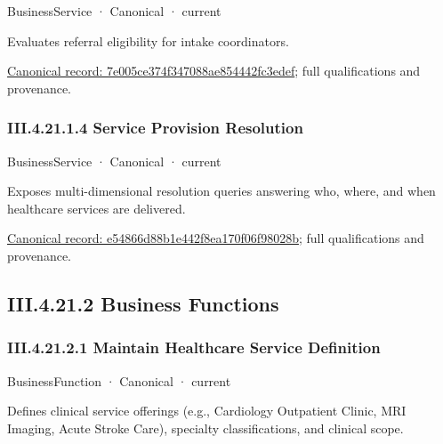 \label{element:7e005ce374f347088ae854442fc3edef}
{\small BusinessService · Canonical · current}\par

Evaluates referral eligibility for intake coordinators.


{\footnotesize \href{../../../../continuum/business/business-service/7e005ce374f347088ae854442fc3edef.md}{Canonical record: 7e005ce374f347088ae854442fc3edef}; full qualifications and provenance.}\par
\subsubsection*{III.4.21.1.4 Service Provision Resolution}
\label{navigation:III.4.21.1.4}

\label{element:e54866d88b1e442f8ea170f06f98028b}
{\small BusinessService · Canonical · current}\par

Exposes multi-dimensional resolution queries answering who, where, and when healthcare services are delivered.


{\footnotesize \href{../../../../continuum/business/business-service/e54866d88b1e442f8ea170f06f98028b.md}{Canonical record: e54866d88b1e442f8ea170f06f98028b}; full qualifications and provenance.}\par
\subsection*{III.4.21.2 Business Functions}
\label{navigation:III.4.21.2}

\subsubsection*{III.4.21.2.1 Maintain Healthcare Service Definition}
\label{navigation:III.4.21.2.1}

\label{element:833a98c58dae416da783ef6e77290576}
{\small BusinessFunction · Canonical · current}\par

Defines clinical service offerings (e.g., Cardiology Outpatient Clinic, MRI Imaging, Acute Stroke Care), specialty classifications, and clinical scope.


